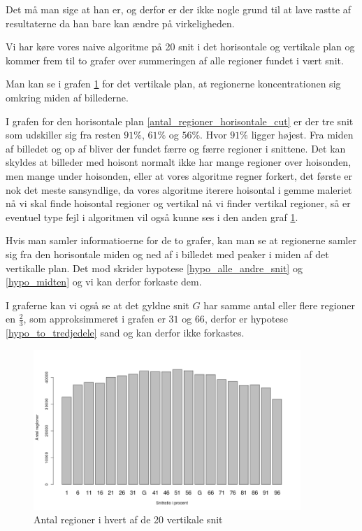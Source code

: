 Det må man sige at han er, og derfor er der ikke nogle grund til at lave
rastte af resultaterne da han bare kan ændre på virkeligheden.

Vi har køre vores naive algoritme på 20 snit i det horisontale og
vertikale plan og kommer frem til to grafer over summeringen af alle
regioner fundet i vært snit. 

Man kan se i grafen \ref{antal_regioner_vertikale_cut} for det vertikale
plan, at regionerne koncentrationen sig omkring miden af billederne.

I grafen for den horisontale plan \ref{antal_regioner_horisontale_cut}
er der tre snit som udskiller sig fra resten $91\%$, $61\%$ og $56\%$.
Hvor $91\%$ ligger højest. Fra miden af billedet og op af bliver der
fundet færre og færre regioner i snittene. Det kan skyldes at billeder med
hoisont normalt ikke har mange regioner over hoisonden, men mange under
hoisonden, eller at vores algoritme regner forkert, det første er nok det meste
sansyndlige, da vores algoritme iterere hoisontal i gemme maleriet nå vi skal
finde hoisontal regioner og vertikal nå vi finder vertikal regioner, så er
eventuel type fejl i algoritmen vil også kunne ses i den anden graf
\ref{antal_regioner_vertikale_cut}.

Hvis man samler informatioerne for de to grafer, kan man se at regionerne
samler sig fra den horisontale miden og ned af i billedet med peaker i
miden af det vertikalle plan. Det mod skrider hypotese \ref{hypo_alle_andre_snit} og \ref{hypo_midten}
og vi kan derfor forkaste dem.

I graferne kan vi også se at det gyldne snit $G$ har samme antal eller
flere regioner en $\frac{2}{3}$, som approksimmeret i grafen er $31$ og
$66$, derfor er hypotese \ref{hypo_to_tredjedele} sand og kan derfor ikke forkastes.

\begin{figure}[h!]
	\begin{center}
		\includegraphics[width=0.9\textwidth]{afsnit/resultater/billeder/cut0cut1eatsperratio.png}
	\end{center}
	\caption{Antal regioner i hvert af de 20 vertikale snit}
	\label{antal_regioner_vertikale_cut}
\end{figure}


